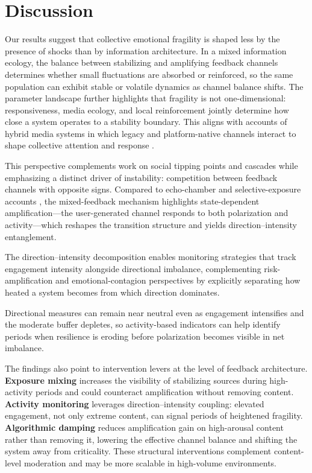 \documentclass[11pt]{article}
\begin{document}
\FloatBarrier
\section{Discussion}
Our results suggest that collective emotional fragility is shaped less by the presence of shocks than by information architecture. In a mixed information ecology, the balance between stabilizing and amplifying feedback channels determines whether small fluctuations are absorbed or reinforced, so the same population can exhibit stable or volatile dynamics as channel balance shifts. The parameter landscape further highlights that fragility is not one-dimensional: responsiveness, media ecology, and local reinforcement jointly determine how close a system operates to a stability boundary. This aligns with accounts of hybrid media systems in which legacy and platform-native channels interact to shape collective attention and response \citep{Chadwick2017}.

This perspective complements work on social tipping points and cascades \citep{Granovetter1978,Watts2002,Centola2018Tipping,Baronchelli2018} while emphasizing a distinct driver of instability: competition between feedback channels with opposite signs. Compared to echo-chamber and selective-exposure accounts \citep{Bakshy2015,DelVicario2016SciRep,DelVicario2016PNAS}, the mixed-feedback mechanism highlights state-dependent amplification---the user-generated channel responds to both polarization and activity---which reshapes the transition structure and yields direction--intensity entanglement.

The direction--intensity decomposition enables monitoring strategies that track engagement intensity alongside directional imbalance, complementing risk-amplification and emotional-contagion perspectives \citep{Kasperson1988,Kramer2014,Fan2014,Brady2023} by explicitly separating how heated a system becomes from which direction dominates.

Directional measures can remain near neutral even as engagement intensifies and the moderate buffer depletes, so activity-based indicators can help identify periods when resilience is eroding before polarization becomes visible in net imbalance.

The findings also point to intervention levers at the level of feedback architecture. \textbf{Exposure mixing} increases the visibility of stabilizing sources during high-activity periods and could counteract amplification without removing content. \textbf{Activity monitoring} leverages direction--intensity coupling: elevated engagement, not only extreme content, can signal periods of heightened fragility. \textbf{Algorithmic damping} reduces amplification gain on high-arousal content rather than removing it, lowering the effective channel balance and shifting the system away from criticality. These structural interventions complement content-level moderation and may be more scalable in high-volume environments.
\end{document}
